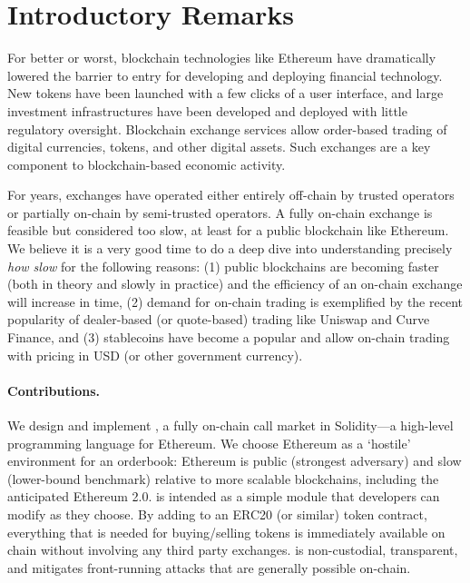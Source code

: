 
\section{Introductory Remarks}

For better or worst, blockchain technologies like Ethereum have dramatically lowered the barrier to entry for developing and deploying financial technology. New tokens have been launched with a few clicks of a user interface, and large investment infrastructures have been developed and deployed with little regulatory oversight. Blockchain exchange services allow order-based trading of digital currencies, tokens, and other digital assets. Such exchanges are a key component to blockchain-based economic activity. 

For years, exchanges have operated either entirely off-chain by trusted operators or partially on-chain by semi-trusted operators. A fully on-chain exchange is feasible but considered too slow, at least for a public blockchain like Ethereum. We believe it is a very good time to do a deep dive into understanding precisely \textit{how slow} for the following reasons: (1) public blockchains are becoming faster (both in theory and slowly in practice) and the efficiency of an on-chain exchange will increase in time, (2) demand for on-chain trading is exemplified by the recent popularity of dealer-based (or quote-based) trading like Uniswap and Curve Finance, and (3) stablecoins have become a popular and allow on-chain trading with pricing in USD (or other government currency).


\paragraph{Contributions.}

We design and implement \cm, a fully on-chain call market in Solidity---a high-level programming language for Ethereum. We choose Ethereum as a `hostile' environment for an orderbook: Ethereum is public (strongest adversary) and slow (lower-bound benchmark) relative to more scalable blockchains, including the anticipated Ethereum 2.0. \cm is intended as a simple module that developers can modify as they choose. By adding \cm to an ERC20 (or similar) token contract, everything that is needed for buying/selling tokens is immediately available on chain without involving any third party exchanges. \cm is non-custodial, transparent, and mitigates front-running attacks that are generally possible on-chain.

